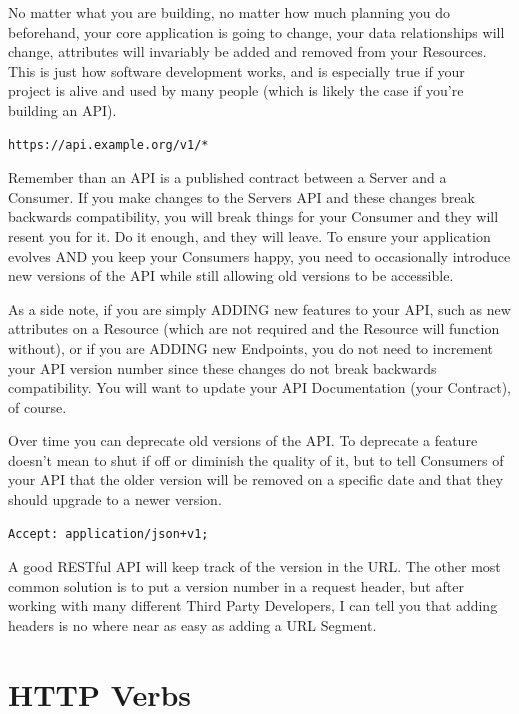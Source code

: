 \documentclass{book}
\begin{document}
No matter what you are building, no matter how much planning you do beforehand, your core application is going to change, your data relationships will change, attributes will invariably be added and removed from your Resources. This is just how software development works, and is especially true if your project is alive and used by many people (which is likely the case if you're building an API).

\begin{verbatim}
https://api.example.org/v1/*
\end{verbatim}

Remember than an API is a published contract between a Server and a Consumer. If you make changes to the Servers API and these changes break backwards compatibility, you will break things for your Consumer and they will resent you for it. Do it enough, and they will leave. To ensure your application evolves AND you keep your Consumers happy, you need to occasionally introduce new versions of the API while still allowing old versions to be accessible.

As a side note, if you are simply ADDING new features to your API, such as new attributes on a Resource (which are not required and the Resource will function without), or if you are ADDING new Endpoints, you do not need to increment your API version number since these changes do not break backwards compatibility. You will want to update your API Documentation (your Contract), of course.

Over time you can deprecate old versions of the API. To deprecate a feature doesn't mean to shut if off or diminish the quality of it, but to tell Consumers of your API that the older version will be removed on a specific date and that they should upgrade to a newer version.

\begin{verbatim}
Accept: application/json+v1;
\end{verbatim}

A good RESTful API will keep track of the version in the URL. The other most common solution is to put a version number in a request header, but after working with many different Third Party Developers, I can tell you that adding headers is no where near as easy as adding a URL Segment.


\chapter{HTTP Verbs}
\end{document}
